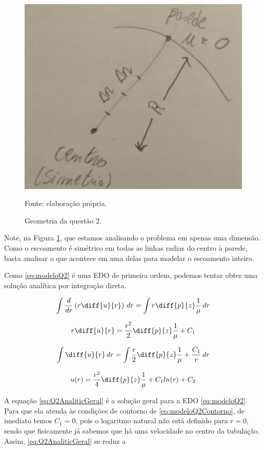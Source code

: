\begin{figure}[h!]
    \caption{Geometria da questão 2.}
    \label{fig:geometriaQ2}
    \centering
    \centerline{\includegraphics[scale=0.35]{geometriaQ2.png}}
    \par{Fonte: elaboração própria.}
\end{figure}

Note, na Figura \ref*{fig:geometriaQ2}, que estamos analisando o problema em apenas uma dimensão. Como o escoamento
é simétrico em todas as linhas radias do centro à parede, basta analisar o que acontece em uma delas para modelar o 
escoamento inteiro.

Como \eqref{eq:modeloQ2} é uma EDO de primeira ordem, podemos tentar obter uma solução
analítica por integração direta.

\[ \int \frac{d}{dr} \left(r\diff{u}{r}\right) \, dr = \int r \diff{p}{z} \frac{1}{\mu} \, dr \]

\[ r \diff{u}{r} = \frac{r^2}{2} \diff{p}{z} \frac{1}{\mu} + C_1 \]

\[ \int \diff{u}{r} \, dr = \int  \frac{r}{2} \diff{p}{z} \frac{1}{\mu} + \frac{C_1}{r} \, dr \]

\begin{equation}\label{eq:Q2AnaliticGeral}
    u(r) = \frac{r^2}{4} \diff{p}{z} \frac{1}{\mu} + C_1 ln (r) + C_2
\end{equation}

A equação \eqref{eq:Q2AnaliticGeral} é a solução geral para a EDO \eqref{eq:modeloQ2}.
Para que ela atenda às condições de contorno de \eqref{eq:modeloQ2Contorno}, de imediato
temos $C_1 = 0$, pois o logaritmo natural não está definido para $r = 0$,
sendo que fisicamente já sabemos que há uma velocidade no centro da tubulação. Assim,
\eqref{eq:Q2AnaliticGeral} se reduz a

